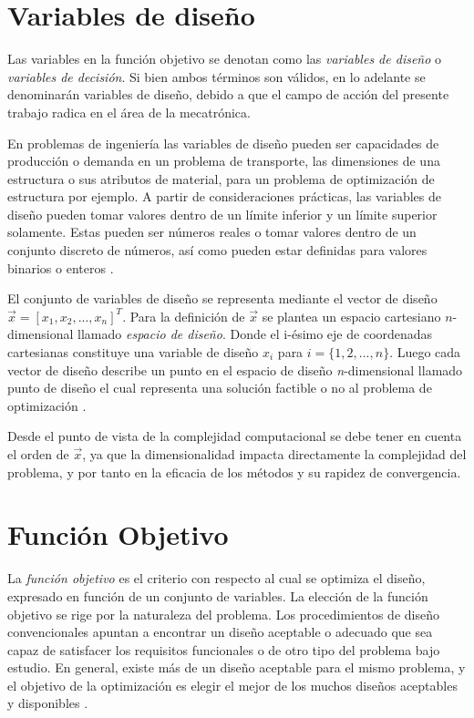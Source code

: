 \section{Variables de diseño}\label{variables}
Las variables en la función objetivo se denotan como las \textit{variables de diseño} o \textit{variables de decisión}. Si bien ambos términos son válidos, en lo adelante se denominarán variables de diseño, debido a que el campo de acción del presente trabajo radica en el área de la mecatrónica.

En problemas de ingeniería las variables de diseño pueden ser capacidades de producción o demanda en un problema de transporte, las dimensiones de una estructura o sus atributos de material, para un problema de optimización de estructura por ejemplo. A partir de consideraciones prácticas, las variables de diseño pueden tomar valores dentro de un límite inferior y un límite superior solamente. Estas pueden ser números reales o tomar valores dentro de un conjunto discreto de números, así como pueden estar definidas para valores binarios o enteros \cite{arora_optimization:_2015}.

El conjunto de variables de diseño se representa mediante  el vector de diseño $\vec{x}=[x_1, x_2, ..., x_n]^T$. Para la definición de $\vec{x}$ se plantea un espacio cartesiano $n$-dimensional llamado \textit{espacio de diseño}. Donde el i-ésimo eje de coordenadas cartesianas constituye una variable de diseño $x_i$ para  $i = \{1,2, ..., n\}$. Luego cada  vector de diseño describe un punto en el espacio de diseño \textit{n}-dimensional llamado punto de diseño  el cual representa una solución factible o no al problema de optimización \cite{rao_engineering_2009}.

Desde el punto de vista de la complejidad computacional se debe tener en cuenta el orden de $\vec{x}$, ya que la dimensionalidad impacta directamente la complejidad del problema, y por tanto en la eficacia de los métodos y su rapidez de convergencia.

\section{Función Objetivo}
La \textit{función objetivo} es el criterio con respecto al cual se optimiza el diseño, expresado en función de un conjunto de variables. La elección de la función objetivo se rige por la naturaleza del problema. Los procedimientos de diseño convencionales apuntan a encontrar un diseño aceptable o adecuado que sea capaz de satisfacer los requisitos funcionales o de otro tipo del problema bajo estudio. En general, existe más de un diseño aceptable para el mismo problema, y el objetivo de la optimización es elegir el mejor de los muchos diseños aceptables y disponibles \cite{arora_optimization:_2015}.

